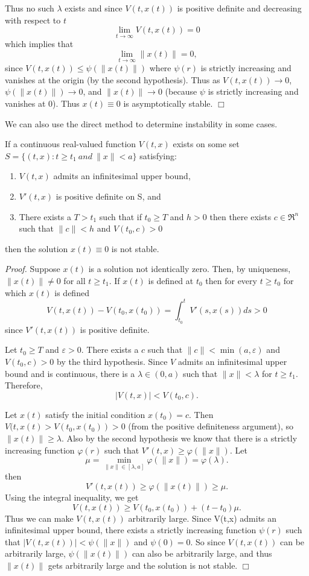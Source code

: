 \documentclass[12pt]{article}
\def\e{there exists }
\def\E{There exists }
\def\pf{{\em Proof. }}
\def\eps{\varepsilon}
\def\vphi{\varphi}
\begin{document}
Thus no such $\lambda$ exists and since $V(t,x(t))$ is positive definite and
decreasing with respect to $t$
$$\lim_{t \rightarrow \infty} V(t,x(t)) = 0$$
which implies that
$$\lim_{t \rightarrow \infty} \| x(t) \| = 0,$$
since $V(t,x(t)) \le \psi (\| x(t) \|)$ where $\psi (r)$ is strictly
increasing and vanishes at the origin (by the second hypothesis).
Thus as $V(t,x(t)) \rightarrow 0$, $\psi(\| x(t) \|) \rightarrow 0$,
and $\| x(t) \| \rightarrow 0$ (because $\psi$ is strictly increasing
and vanishes at 0).  Thus $x(t) \equiv 0$ is asymptotically stable. $\Box$

We can also use the direct method to determine instability in some cases.

\begin{thm}
	If a continuous real-valued function $V(t,x)$ exists on some set
$S = \{ (t,x) : t \ge t_1 \ and \ \| x \| < a \} $ satisfying:
\begin{enumerate}
\item $V(t,x)$ admits an infinitesimal upper bound,
\item $V'(t,x)$ is positive definite on S, and
\item \E a $T > t_1$ such that if $t_0 \ge T$ and $h > 0$ then \e $c
\in \Re^n$ such that $\| c \| < h$ and $V(t_0,c) > 0$
\end{enumerate}
then the solution $x(t) \equiv 0$ is not stable.
\end{thm}

\pf Suppose $x(t)$ is a solution not identically zero.  Then, by
uniqueness, $ \| x(t) \| \neq 0$ for all $t \ge t_1$.  If $x(t)$ is
defined at $t_0$ then for every $t \ge t_0$ for which $x(t)$ is
defined
$$V(t,x(t)) - V(t_0, x(t_0)) = \int^t_{t_0} V'(s,x(s)) ds > 0$$
since $V'(t,x(t))$ is positive definite.

Let $t_0 \ge T$ and $\eps > 0$.  There exists a $c$ such that $\| c \|
< \min(a,\eps)$ and $V(t_0,c) > 0$ by the third hypothesis.  Since $V$
admits an infinitesimal upper bound and is continuous, there is a
$\lambda \in (0,a)$ such that $\| x \| < \lambda$ for $t \ge t_1$.
Therefore,
$$| V(t,x) | < V(t_0, c).$$

Let $x(t)$ satisfy the initial condition $x(t_0) = c$.  Then $V(t,x(t)
> V(t_0, x(t_0)) > 0$ (from the positive definiteness argument), so
$\| x(t) \| \ge \lambda$.  Also by the second hypothesis we know that
there is a strictly increasing function $\vphi(r)$ such that $V'(t,x)
\ge \vphi(\| x \|)$.  Let
$$ \mu = \min_{\| x \| \in [\lambda, a]} \vphi(\| x \|) = \vphi (\lambda).$$
then
$$V'(t,x(t)) \ge \vphi(\| x(t) \|) \ge \mu.$$
Using the integral inequality, we get
$$V(t,x(t)) \ge V(t_0, x(t_0)) + (t - t_0) \mu.$$ Thus we can make
$V(t, x(t))$ arbitrarily large.  Since V(t,x) admits an infinitesimal
upper bound, there exists a strictly increasing function $\psi (r)$
such that $|V(t,x(t))| < \psi (\| x \|)$ and $\psi (0) = 0$.  So since
$V(t,x(t))$ can be arbitrarily large, $\psi(\| x(t) \|)$ can also be
arbitrarily large, and thus $\| x(t) \|$ gets arbitrarily large and the
solution is not stable. $\Box$
\end{document}
